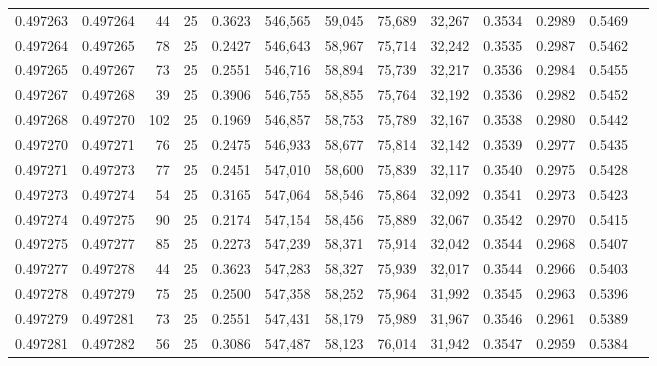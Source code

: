\begin{tabular}{rrrrrrrrrrrrr}
0.497263 & 0.497264 &    44 &  25 &                                     0.3623 & 546,565 &  59,045 &  75,689 &  32,267 & 0.3534 & 0.2989 & 0.5469 \\
0.497264 & 0.497265 &    78 &  25 &                                     0.2427 & 546,643 &  58,967 &  75,714 &  32,242 & 0.3535 & 0.2987 & 0.5462 \\
0.497265 & 0.497267 &    73 &  25 &                                     0.2551 & 546,716 &  58,894 &  75,739 &  32,217 & 0.3536 & 0.2984 & 0.5455 \\
0.497267 & 0.497268 &    39 &  25 &                                     0.3906 & 546,755 &  58,855 &  75,764 &  32,192 & 0.3536 & 0.2982 & 0.5452 \\
0.497268 & 0.497270 &   102 &  25 &                                     0.1969 & 546,857 &  58,753 &  75,789 &  32,167 & 0.3538 & 0.2980 & 0.5442 \\
0.497270 & 0.497271 &    76 &  25 &                                     0.2475 & 546,933 &  58,677 &  75,814 &  32,142 & 0.3539 & 0.2977 & 0.5435 \\
0.497271 & 0.497273 &    77 &  25 &                                     0.2451 & 547,010 &  58,600 &  75,839 &  32,117 & 0.3540 & 0.2975 & 0.5428 \\
0.497273 & 0.497274 &    54 &  25 &                                     0.3165 & 547,064 &  58,546 &  75,864 &  32,092 & 0.3541 & 0.2973 & 0.5423 \\
0.497274 & 0.497275 &    90 &  25 &                                     0.2174 & 547,154 &  58,456 &  75,889 &  32,067 & 0.3542 & 0.2970 & 0.5415 \\
0.497275 & 0.497277 &    85 &  25 &                                     0.2273 & 547,239 &  58,371 &  75,914 &  32,042 & 0.3544 & 0.2968 & 0.5407 \\
0.497277 & 0.497278 &    44 &  25 &                                     0.3623 & 547,283 &  58,327 &  75,939 &  32,017 & 0.3544 & 0.2966 & 0.5403 \\
0.497278 & 0.497279 &    75 &  25 &                                     0.2500 & 547,358 &  58,252 &  75,964 &  31,992 & 0.3545 & 0.2963 & 0.5396 \\
0.497279 & 0.497281 &    73 &  25 &                                     0.2551 & 547,431 &  58,179 &  75,989 &  31,967 & 0.3546 & 0.2961 & 0.5389 \\
0.497281 & 0.497282 &    56 &  25 &                                     0.3086 & 547,487 &  58,123 &  76,014 &  31,942 & 0.3547 & 0.2959 & 0.5384 \\

\end{tabular}
